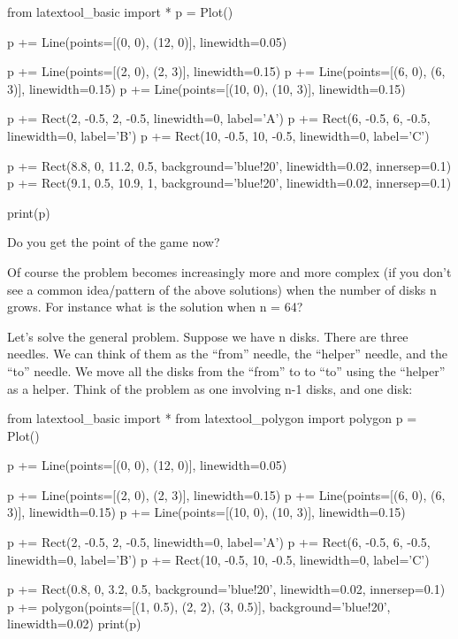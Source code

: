 \begin{python}
from latextool_basic import *
p = Plot()

p += Line(points=[(0, 0), (12, 0)], linewidth=0.05)

p += Line(points=[(2, 0), (2, 3)], linewidth=0.15)
p += Line(points=[(6, 0), (6, 3)], linewidth=0.15)
p += Line(points=[(10, 0), (10, 3)], linewidth=0.15)

p += Rect(2, -0.5, 2, -0.5, linewidth=0, label='A')
p += Rect(6, -0.5, 6, -0.5, linewidth=0, label='B')
p += Rect(10, -0.5, 10, -0.5, linewidth=0, label='C')

p += Rect(8.8, 0, 11.2, 0.5, background='blue!20', linewidth=0.02, innersep=0.1)  
p += Rect(9.1, 0.5, 10.9, 1, background='blue!20', linewidth=0.02, innersep=0.1)

print(p)
\end{python}

 Do you get the point of the game now?



 Of course the problem becomes increasingly more and more complex (if you
 don't see a common idea/pattern of the above solutions) when the number
 of disks n grows. For instance what is the solution when n = 64?

 Let's solve the general problem. Suppose we have n
 disks. There are three needles. We can think of them as the ``from''
 needle, the ``helper'' needle, and the ``to'' needle. We move all the
 disks from the ``from'' to to ``to'' using the ``helper'' as a helper.
 Think of the problem as one involving n-1 disks, and one disk:

\begin{python}
from latextool_basic import *
from latextool_polygon import polygon
p = Plot()

p += Line(points=[(0, 0), (12, 0)], linewidth=0.05)

p += Line(points=[(2, 0), (2, 3)], linewidth=0.15)
p += Line(points=[(6, 0), (6, 3)], linewidth=0.15)
p += Line(points=[(10, 0), (10, 3)], linewidth=0.15)

p += Rect(2, -0.5, 2, -0.5, linewidth=0, label='A')
p += Rect(6, -0.5, 6, -0.5, linewidth=0, label='B')
p += Rect(10, -0.5, 10, -0.5, linewidth=0, label='C')

p += Rect(0.8, 0, 3.2, 0.5, background='blue!20', linewidth=0.02, innersep=0.1)  
p += polygon(points=[(1, 0.5), (2, 2), (3, 0.5)], background='blue!20', linewidth=0.02)
print(p)
\end{python}


